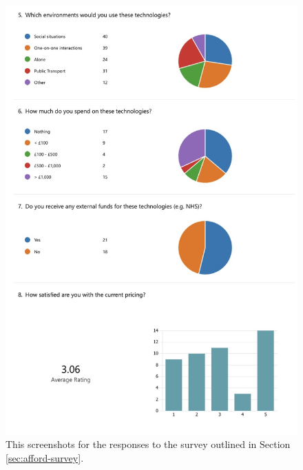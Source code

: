 \documentclass{l4proj}
\begin{document}
\begin{appendices}
\begin{figure}[H]
    \centering
    \includegraphics[width=0.75\linewidth]{dissertation/images/afford-survey-2.jpeg}    
    \caption{This screenshots for the responses to the survey outlined in Section \ref{sec:afford-survey}.}
    \label{fig:afford-survey-2} 
\end{figure}


\end{appendices}
\end{document}
